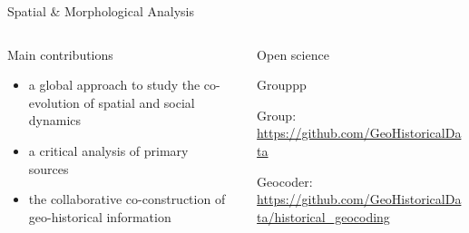 \documentclass[final,hyperref={pdfpagelabels=false}]{beamer}
\let\oldcite=\cite
\renewcommand{\cite}[1]{\textcolor{ta3chameleon}{\oldcite{#1}}}
\begin{document}
\begin{frame}
\begin{columns}
\begin{column}{0.494\textwidth}
\begin{block}{Spatial \& Morphological Analysis}
      \end{block}
    \end{column}
  \end{columns}
  \begin{columns}
\centering
    \begin{column}{0.594\textwidth}
      \begin{block}{Main contributions}%
        \tiny
        \begin{itemize}
        \item a \textcolor{ta3orange}{global approach} to study the co-evolution of spatial and social dynamics~\cite{Dumenieu2013a, Dumenieu2015PhD}
        \item a \textcolor{ta3orange}{critical analysis} of \textcolor{ta3orange}{primary sources}~\cite{Costes2015_, Dumenieu2015PhD, Costes2016PhD, Dumenieu2018}
        \item the \textcolor{ta3orange}{collaborative co-construction} of geo-historical information~\cite{Perret2015_, Perret2015Data_, Cura2018}
        \end{itemize}
      \end{block}
    \end{column}
    \begin{column}{0.394\textwidth}
          \begin{block}{Open science}
    \vspace*{-0.25em}
            \begin{Mdescription}{Grouppp}
              \scriptsize
            \item[\textcolor{ta3orange}{Group:}] \url{https://github.com/GeoHistoricalData}\\
            \item[\textcolor{ta3orange}{Geocoder:}] \url{https://github.com/GeoHistoricalData/historical_geocoding}\\

\end{Mdescription}
\end{block}
\end{column}
\end{columns}
\end{frame}
\end{document}
